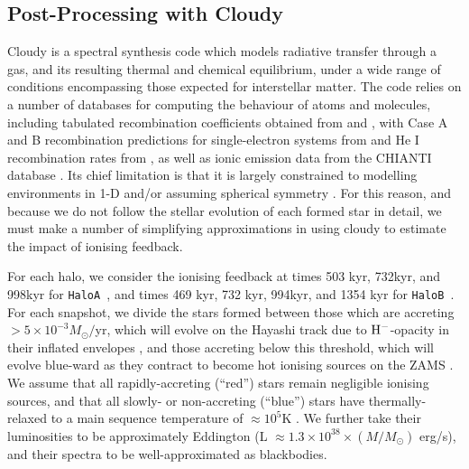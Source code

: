 \documentclass[graphics, twocolumn, usenatbib]{mn2e}
\newcommand{\ha} {\texttt{HaloA~}}
\newcommand{\hb} {\texttt{HaloB~}}
\begin{document}
\subsection{Post-Processing with Cloudy}
\label{cloudy:description}
{\sc Cloudy} \citep{Ferland_2017} is a spectral synthesis code which models radiative transfer through a gas, and its resulting thermal and chemical equilibrium, under a wide range of conditions encompassing those expected for interstellar matter. %
The code relies on a number of databases for computing the behaviour of atoms and molecules, including tabulated recombination coefficients obtained from \cite{Badnell_2003} and \cite{Badnell_2006}, with Case A and B recombination predictions for single-electron systems from \cite{Storey_1995} and He I recombination rates from \cite{Porter_2012}, as well as ionic emission data from the CHIANTI database \citep{Dere_1997,Dere_2012}. Its chief limitation is that it is largely constrained to modelling environments in 1-D and/or assuming spherical symmetry \citep[though see, e.g.,][for recent efforts to extend its implementation to pseudo-3-D problems]{Morisset_2013, Fitzgerald_2020}. For this reason, and because we do not follow the stellar evolution of each formed star in detail, we must make a number of simplifying approximations in using {\sc cloudy} to estimate the impact of ionising feedback. 

For each halo, we consider the ionising feedback at times 503 kyr, 732kyr, and 998kyr for \ha, and times 469 kyr, 732 kyr, 994kyr, and 1354 kyr for \hb. For each snapshot, we divide the stars formed between those which are accreting $> 5 \times 10^{-3} M_{\odot}/$yr, which will evolve on the Hayashi track due to $\rm{H}^{-}$-opacity in their inflated envelopes \citep[e.g.,][]{Hosokawa_2013}, and those accreting below this threshold, which will evolve blue-ward as they contract to become hot ionising sources on the ZAMS \citep{Haemmerle_2017}. We assume that all rapidly-accreting (``red'') stars remain negligible ionising sources, and that all slowly- or non-accreting (``blue'') stars have thermally-relaxed to a main sequence temperature of $\approx 10^{5}$K \citep{Schaerer_2002, Woods_2020}. We further take their luminosities to be approximately Eddington (L $\approx 1.3\times 10^{38} \times (M/M_{\odot})$ erg/s), and their spectra to be well-approximated as blackbodies.
\end{document}
